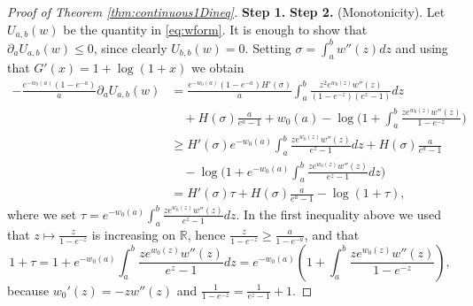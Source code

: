 \documentclass[a4paper,reqno,12pt]{amsart}
\renewcommand{\r}{\mathbb{R}}
\newcommand{\si}{\sigma}
\newcommand{\1}{\bo{1}}
\begin{document}
\begin{proof}[Proof of Theorem \ref{thm:continuous1Dineq}] {\bf Step 1. }
{\bf Step 2. }(Monotonicity). Let $U_{a,b}(w)$ be the quantity in \eqref{eq:wform}.  It is enough to show that $\partial_a U_{a,b}(w) \leq 0$, since clearly $U_{b,b}(w)=0$. Setting $\si=\int_a^b w''(z) dz$ and using that $G'(x)=1+\log(1+x)$ we obtain
\begin{align*}
-\frac{e^{-w_0(a)}(1-e^{-a})}{a}\partial_a U_{a,b}(w)  & = \frac{e^{-w_0(a)}(1-e^{-a})H'(\si)}{a}\int_{a}^b \frac{z^2{e^{w_0(z)}}w''(z)}{(1-e^{-z})(e^z-1)}dz
\\  & \quad +H(\si) \frac{a}{e^{a}-1}  +    w_0(a)-\log\bigg(1+ \int_a^b \frac{ze^{w_0(z)}w''(z)}{1-e^{-z}}\bigg) \\
& \geq H'(\si)e^{-w_0(a)}\int_{a}^b \frac{z{e^{w_0(z)}}w''(z)}{e^z-1}dz +H(\si) \frac{a}{e^{a}-1}   \\  & \quad - \log\bigg(1+ e^{-w_0(a)}\int_a^b \frac{ze^{w_0(z)}w''(z)}{e^{z}-1}dz\bigg)\\
& =  H'(\si)\tau +H(\si) \frac{a}{e^{a}-1}   - \log (1+\tau),
\end{align*}
where we set $\tau =e^{-w_0(a)}\int_a^b \frac{ze^{w_0(z)}w''(z)}{e^{z}-1}dz$. In the first inequality above we used that $z\mapsto \frac{z}{1-e^{-z}}$ is increasing on $\r$, hence $ \frac{z}{1-e^{-z}} \geq \frac{a}{1-e^{-a}} $, and that 
\[
1+\tau =1+ e^{-w_0(a)}\int_a^b \frac{ze^{w_0(z)}w''(z)}{e^{z}-1}dz = e^{-w_0(a)}\left(1+ \int_a^b \frac{ze^{w_0(z)}w''(z)}{1-e^{-z}}\right),
\]
because $w_0'(z)=-zw''(z)$ and $\frac{1}{1-e^{-z}} = \frac{1}{e^z-1}+1$.


\end{proof}
\end{document}
